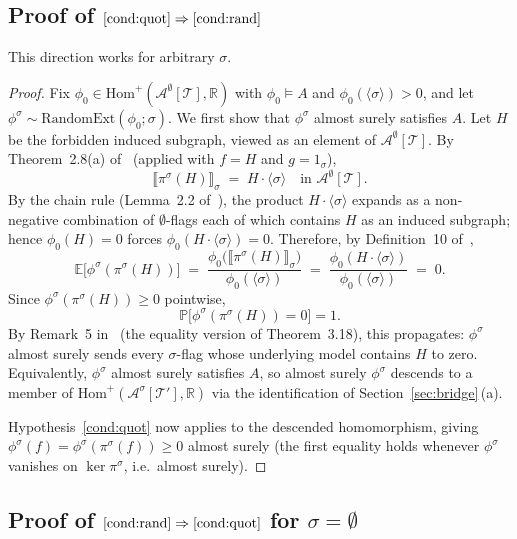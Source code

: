 \documentclass[11pt]{article}
\theoremstyle{definition}
\newcommand{\R}{\mathbb{R}}
\newcommand{\E}{\mathbb{E}}
\newcommand{\Prob}{\mathbb{P}}
\newcommand{\A}{\mathcal{A}}
\newcommand{\T}{\mathcal{T}}
\newcommand{\Homp}{\mathrm{Hom}^{+}}
\newcommand{\RandomExt}{\mathrm{RandomExt}}
\newcommand{\avg}[2]{\llbracket #1 \rrbracket_{#2}}
\begin{document}
\subsection{Proof of \texorpdfstring{$\ref{cond:quot} \Rightarrow
\ref{cond:rand}$}{(1) implies (2)}}

This direction works for arbitrary $\sigma$.

\begin{proof}
Fix $\phi_0 \in \Homp(\A^{\emptyset}[\T], \R)$ with $\phi_0 \models A$ and
$\phi_0(\langle \sigma \rangle) > 0$, and let $\phi^{\sigma} \sim
\RandomExt(\phi_0; \sigma)$. We first show that $\phi^{\sigma}$ almost surely
satisfies $A$. Let $H$ be the forbidden induced subgraph, viewed as an
element of $\A^{\emptyset}[\T]$. By Theorem~2.8(a) of~\cite{Razborov2007}
(applied with $f = H$ and $g = 1_{\sigma}$),
\[
  \avg{\pi^{\sigma}(H)}{\sigma} \;=\; H \cdot \langle \sigma \rangle
  \quad \text{in } \A^{\emptyset}[\T].
\]
By the chain rule (Lemma~2.2 of~\cite{Razborov2007}), the product
$H \cdot \langle\sigma\rangle$ expands as a non-negative combination of
$\emptyset$-flags each of which contains $H$ as an induced subgraph; hence
$\phi_0(H) = 0$ forces $\phi_0(H \cdot \langle\sigma\rangle) = 0$. Therefore,
by Definition~10 of~\cite{Razborov2007},
\[
  \E\bigl[\phi^{\sigma}(\pi^{\sigma}(H))\bigr]
  \;=\;
  \frac{\phi_0\bigl(\avg{\pi^{\sigma}(H)}{\sigma}\bigr)}{\phi_0(\langle \sigma \rangle)}
  \;=\;
  \frac{\phi_0(H \cdot \langle \sigma \rangle)}{\phi_0(\langle\sigma\rangle)}
  \;=\; 0.
\]
Since $\phi^{\sigma}(\pi^{\sigma}(H)) \geq 0$ pointwise,
\[
  \Prob\bigl[\phi^{\sigma}(\pi^{\sigma}(H)) = 0\bigr] = 1.
\]
By Remark~5 in~\cite{Razborov2007} (the equality version of Theorem~3.18),
this propagates: $\phi^{\sigma}$ almost surely sends every $\sigma$-flag whose
underlying model contains $H$ to zero. Equivalently, $\phi^{\sigma}$ almost
surely satisfies $A$, so almost surely $\phi^{\sigma}$ descends to a member of
$\Homp(\A^{\sigma}[\T'], \R)$ via the identification of
Section~\ref{sec:bridge}\,(a).

Hypothesis~\ref{cond:quot} now applies to the descended homomorphism, giving
$\phi^{\sigma}(f) = \phi^{\sigma}(\pi^{\sigma}(f)) \geq 0$ almost surely (the
first equality holds whenever $\phi^{\sigma}$ vanishes on $\ker \pi^{\sigma}$,
i.e.\ almost surely).
\end{proof}

\subsection{Proof of \texorpdfstring{$\ref{cond:rand} \Rightarrow
\ref{cond:quot}$}{(2) implies (1)} for $\sigma = \emptyset$}
\end{document}
